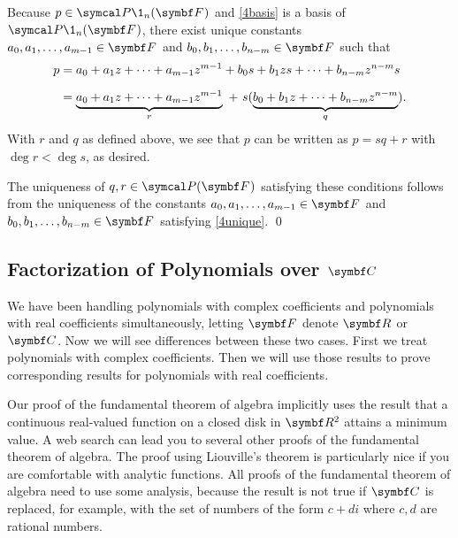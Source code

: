 Because $p \in \P\1_n(\F{})$ and \ref{4basis} is a basis of $\P\1_n(\F{})$, there exist unique constants
$
a_0, a_1, \ldots, a_{m-1} \in \F{}$ and $b_0, b_1, \ldots, b_{n-m} \in \F{}
$
such that
\begin{align}
p &= a_0 + a_1 z + \cdots + a_{m-1} z^{m-1} + b_0 s + b_1  zs + \cdots + b_{n-m}z^{n-m} s \label{4unique}\\[6bp]
&= \underbrace{a_0 + a_1 z + \cdots + a_{m-1} z^{m-1}}_r \ +\  s(\underbrace{b_0 + b_1  z + \cdots + b_{n-m}z^{n-m}}_q). \notag
\end{align}
With $r$ and $q$ as defined above, we see that  $p$ can be written as $p=sq+r$ with $\deg r < \deg s$, as desired.

The uniqueness of $q, r \in \P(\F{})$ satisfying these conditions follows from the uniqueness of the constants $
a_0, a_1, \ldots, a_{m-1} \in \F{}$ and $b_0, b_1, \ldots, b_{n-m} \in \F{}
$
satisfying \ref{4unique}.
\qed

    \subsection{Factorization of Polynomials over $\C{}$}


We have been handling polynomials with complex coefficients and polynomials with real coefficients simultaneously, letting $\F{}$ denote $\R{}$ or $\C{}$.  Now we will see differences between these two cases.  First we treat polynomials with complex coefficients.  Then we will use those results to prove corresponding results for polynomials with real coefficients.

Our proof of the fundamental theorem of algebra implicitly uses the result that a continuous real-valued function on a closed disk in $\R 2$ attains a minimum value.
A web search can lead you to several other proofs of the fundamental theorem of algebra. The proof using Liouville's theorem is particularly nice if you are comfortable with analytic functions. All proofs of the fundamental theorem of algebra need to use some analysis, because the result is not true if $\C{}$ is replaced, for example, with the set of numbers of the form $c + di$ where $c, d$ are rational numbers.

